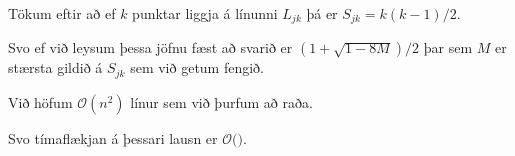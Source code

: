 {
	{
		\item<1-> Tökum eftir að ef $k$ punktar liggja á línunni $L_{jk}$ þá er $S_{jk} = k(k - 1)/2$.
		\item<2-> Svo ef við leysum þessa jöfnu fæst að svarið er $(1 + \sqrt{1 - 8M})/2$ þar sem $M$ er stærsta gildið á $S_{jk}$ sem við getum fengið.
	}
}

{
}

{
}

{
	{
		\item<1-> Við höfum $\mathcal{O}(n^2)$ línur sem við þurfum að raða.
		\item<2-> Svo tímaflækjan á þessari lausn er $\mathcal{O}($\onslide<3->{$n^2 \log n$}$)$.
	}
}

{
}


